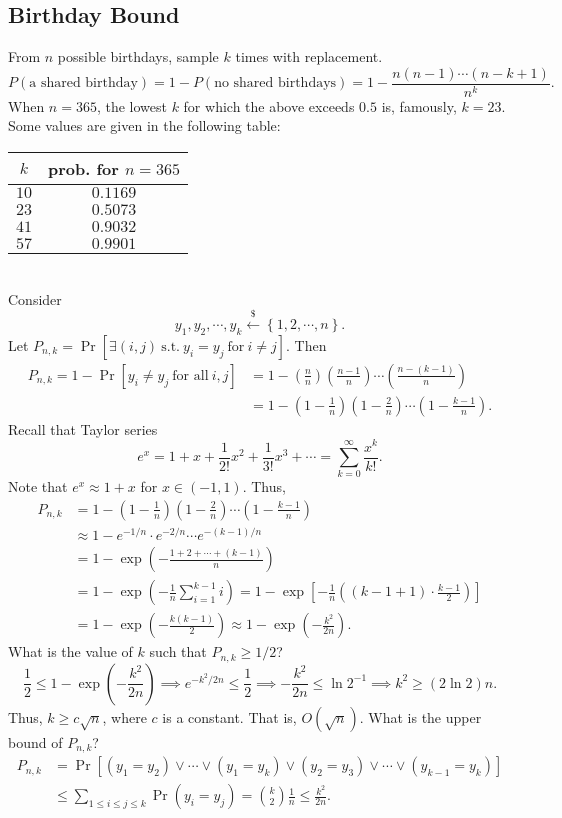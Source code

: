 \documentclass[12pt,openany]{book}
\newcommand{\set}[1]{\left\{#1\right\}}
\newcommand{\dollar}{\$}
\newcommand{\uniform}{\xleftarrow{\dollar}}
\begin{document}
	\subsection{Birthday Bound}
	From $n$ possible birthdays, sample $k$ times with replacement. \[
	P(\text{a shared birthday})=1-P(\text{no shared birthdays})=1-\frac{n(n-1)\cdots(n-k+1)}{n^k}.
	\] When $n=365$, the lowest $k$ for which the above exceeds $0.5$ is, famously, $k=23$. Some values are given in the following table: \begin{table}[h!]
		\centering\begin{tabular}{c|c}
			$k$ & prob. for $n=365$ \\
			\hline
			$10$ & $0.1169$ \\
			$23$ & $0.5073$ \\
			$41$ & $0.9032$ \\
			$57$ & $0.9901$ \\
		\end{tabular}
	\end{table}\
	\\
	Consider \[
	y_1, y_2,\cdots, y_k\uniform\set{1,2,\cdots, n}.
	\] Let $P_{n,k}=\Pr[\exists (i,j)\ \text{s.t.}\ y_i=y_j\ \text{for}\ i\neq j]$. Then \begin{align*}
	P_{n,k}=1-\Pr[y_i\neq y_j\ \text{for all}\ i, j]
	&=1-\left(\frac{n}{n}\right)\left(\frac{n-1}{n}\right)\cdots\left(\frac{n-(k-1)}{n}\right)\\
	&=1-\left(1-\frac{1}{n}\right)\left(1-\frac{2}{n}\right)\cdots\left(1-\frac{k-1}{n}\right).
	\end{align*} Recall that Taylor series \[
	e^x=1+x+\frac{1}{2!}x^2+\frac{1}{3!}x^3+\cdots=\sum_{k=0}^{\infty}\frac{x^k}{k!}.
	\] Note that $e^x\approx1+x$ for $x\in(-1,1)$. Thus, \begin{align*}
	P_{n,k}&=1-\left(1-\frac{1}{n}\right)\left(1-\frac{2}{n}\right)\cdots\left(1-\frac{k-1}{n}\right)\\
	&\approx1-e^{-1/n}\cdot e^{-2/n}\cdots e^{-(k-1)/n}\\
	&=1-\exp\left(-\frac{1+2+\cdots+(k-1)}{n}\right)\\
	&=1-\exp\left(-\frac{1}{n}\sum_{i=1}^{k-1}i\right)=1-\exp\left[-\frac{1}{n}\left((k-1+1)\cdot\frac{k-1}{2}\right)\right]\\
	&=1-\exp\left(-\frac{k(k-1)}{2}\right)\approx1-\exp\left(-\frac{k^2}{2n}\right).
	\end{align*} What is the value of $k$ such that $P_{n,k}\geq 1/2$? \[
	\frac{1}{2}\leq1-\exp\left(-\frac{k^2}{2n}\right)\implies e^{-k^2/2n}\leq\frac{1}{2}\implies-\frac{k^2}{2n}\leq\ln 2^{-1}\implies k^2\geq(2\ln2) n.
	\] Thus, $k\geq c\sqrt{n}$, where $c$ is a constant. That is, $O(\sqrt{n})$. What is the upper bound of $P_{n,k}$? \begin{align*}
	P_{n,k}&=\Pr\left[(y_1=y_2)\lor\cdots\lor(y_1=y_k)\lor(y_2=y_3)\lor\cdots\lor(y_{k-1}=y_k)\right]\\
	&\leq\sum_{1\leq i\leq j\leq k}\Pr(y_i=y_j)=\binom{k}{2}\frac{1}{n}\leq\frac{k^2}{2n}.
	\end{align*}
	
\end{document}
